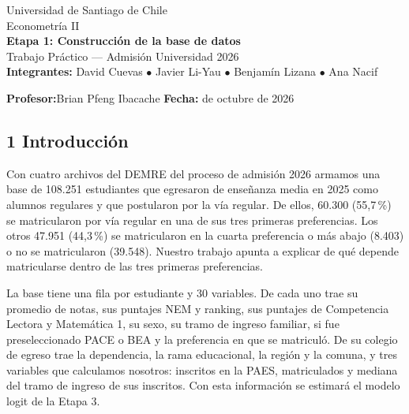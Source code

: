 \documentclass[11pt]{article}
\begin{document}
\sloppy

\begin{titlepage}
\centering
\vspace*{3cm}
{\large Universidad de Santiago de Chile}\\[6pt]
{\large Econometría II}\\[2cm]
{\LARGE \textbf{Etapa 1: Construcción de la base de datos}}\\[10pt]
{\large Trabajo Práctico --- Admisión Universidad 2026}\\[3cm]

\textbf{Integrantes:}\quad
David Cuevas $\bullet$ Javier Li-Yau $\bullet$ Benjamín Lizana $\bullet$ Ana Nacif

\vspace{0.6cm}

\textbf{Profesor:}\quad Brian Pfeng Ibacache
\qquad
\textbf{Fecha:} de octubre de 2026
\end{titlepage}

\subsection*{1 \; Introducción}

Con cuatro archivos del DEMRE del proceso de admisión 2026 armamos una
base de 108.251 estudiantes que egresaron de enseñanza media en 2025
como alumnos regulares y que postularon por la vía regular. De ellos,
60.300 (55,7\,\%) se matricularon por vía regular en una de sus tres
primeras preferencias. Los otros 47.951 (44,3\,\%) se matricularon en la
cuarta preferencia o más abajo (8.403) o no se matricularon (39.548). Nuestro trabajo apunta a explicar
de qué depende matricularse dentro de las tres primeras preferencias.

La base tiene una fila por estudiante y 30 variables. De cada uno trae
su promedio de notas, sus puntajes NEM y ranking, sus puntajes de
Competencia Lectora y Matemática 1, su sexo, su tramo de ingreso
familiar, si fue preseleccionado PACE o BEA y la preferencia en que se
matriculó. De su colegio de egreso trae la dependencia, la rama
educacional, la región y la comuna, y tres variables que calculamos
nosotros: inscritos en la PAES, matriculados y mediana del tramo de
ingreso de sus inscritos. Con esta información se estimará el modelo
logit de la Etapa 3.
\end{document}
